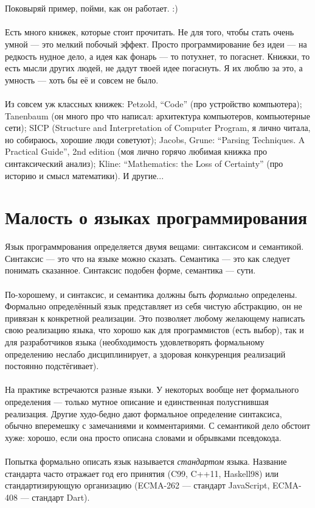 \documentclass[11pt]{book}
\begin{document}
\\ \\
Поковыряй пример, пойми, как он работает. :)
\\ \\
Есть много книжек, которые стоит прочитать.
Не для того, чтобы стать очень умной --- это мелкий побочый эффект.
Просто программирование без идеи --- на редкость нудное дело, а идея как фонарь --- то потухнет, то погаснет.
Книжки, то есть мысли других людей, не дадут твоей идее погаснуть.
Я их люблю за это, а умность --- хоть бы её и совсем не было.
\\ \\
Из совсем уж классных книжек:
Petzold, ``Code'' (про устройство компьютера);
Tanenbaum (он много про что написал: архитектура компьютеров, компьютерные сети);
SICP (Structure and Interpretation of Computer Program, я лично читала, но собираюсь, хорошие люди советуют);
Jacobs, Grune: ``Parsing Techniques. A Practical Guide'', 2nd edition (моя лично горячо любимая книжка про синтаксический анализ);
Kline: ``Mathematics: the Loss of Certainty'' (про историю и смысл математики).
И другие...

\tableofcontents



\chapter{Малость о языках программирования}
Язык программрования определяется двумя вещами: синтаксисом и семантикой.
Синтаксис --- это что на языке можно сказать.
Семантика --- это как следует понимать сказанное.
Синтаксис подобен форме, семантика --- сути.
\\ \\
По-хорошему, и синтаксис, и семантика должны быть \emph{формально} определены.
Формально определённый язык представляет из себя чистую абстракцию, он не привязан к конкретной реализации.
Это позволяет любому желающему написать свою реализацию языка,
что хорошо как для программистов (есть выбор),
так и для разработчиков языка (необходимость удовлетворять формальному определению неслабо дисциплинирует,
а здоровая конкуренция реализаций постоянно подстёгивает).
\\ \\
На практике встречаются разные языки.
У некоторых вообще нет формального определения --- только мутное описание и единственная полусгнившая реализация.
Другие худо-бедно дают формальное определение синтаксиса, обычно вперемешку с замечаниями и комментариями.
С семантикой дело обстоит хуже: хорошо, если она просто описана словами и обрывками псевдокода.
\\ \\
Попытка формально описать язык называется \emph{стандартом} языка.
Название стандарта часто отражает год его принятия (C99, C++11, Haskell98)
или стандартизирующую организацию (ECMA-262 --- стандарт JavaScript, ECMA-408 --- стандарт Dart).
\end{document}
